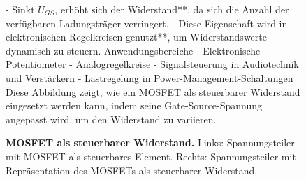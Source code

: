 {\begin{figure}[H]
\begin{minipage}[c]{.48\textwidth}
{    - Sinkt \( U_{GS} \), erhöht sich der Widerstand**, da sich die Anzahl der verfügbaren Ladungsträger verringert.  
    - Diese Eigenschaft wird in elektronischen Regelkreisen genutzt**, um Widerstandswerte dynamisch zu steuern.  
    Anwendungsbereiche
    - Elektronische Potentiometer
    - Analogregelkreise
    - Signalsteuerung in Audiotechnik und Verstärkern
    - Lastregelung in Power-Management-Schaltungen  
    Diese Abbildung zeigt, wie ein MOSFET als steuerbarer Widerstand eingesetzt werden kann, indem seine Gate-Source-Spannung angepasst wird, um den Widerstand zu variieren.}
    \end{minipage}

    \caption{\textbf{MOSFET als steuerbarer Widerstand.} Links: Spannungsteiler mit MOSFET als steuerbares Element. Rechts: 
    Spannungsteiler mit Repräsentation des MOSFETs als steuerbarer Widerstand. }  
    \label{fig:MOSFETAlsSteuerbarerWiderstand}
\end{figure}}





